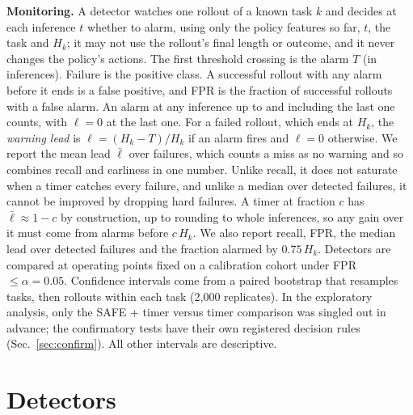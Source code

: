 \documentclass[10pt,a4paper,twocolumn]{article}
\begin{document}
\textbf{Monitoring.} A detector watches one rollout of a known task $k$ and decides at each
inference $t$ whether to alarm, using only the policy features so far, $t$, the task and
$H_k$; it may not use the rollout's final length or outcome, and it never changes the
policy's actions. The first threshold crossing is the alarm $T$ (in inferences). Failure is the positive class. A successful rollout with any alarm before it ends is a false
positive, and FPR is the fraction of successful rollouts with a false alarm. An alarm at any
inference up to and including the last one counts, with $\ell = 0$ at the last one. For a failed rollout, which ends at
$H_k$, the \emph{warning lead} is $\ell = (H_k - T)/H_k$ if an alarm fires and $\ell = 0$
otherwise.
We report the mean lead $\bar\ell$ over failures, which counts a miss as no warning and so
combines recall and earliness in one number. Unlike recall, it does not saturate when a
timer catches every failure, and unlike a median over detected failures, it cannot be
improved by dropping hard failures. A timer at fraction $c$ has $\bar\ell \approx 1 - c$ by construction, up to
rounding to whole inferences, so any gain over it must come from alarms before $c\,H_k$. We also report recall, FPR, the median lead
over detected failures and the fraction alarmed by $0.75\,H_k$.
Detectors are compared at operating points fixed on a calibration cohort under
FPR $\le \alpha = 0.05$. Confidence intervals come from a paired bootstrap that resamples
tasks, then rollouts within each task (2,000 replicates). In the exploratory analysis, only
the SAFE + timer versus timer comparison was singled out in advance; the confirmatory tests
have their own registered decision rules (Sec.~\ref{sec:confirm}). All other intervals are
descriptive.

\section{Detectors}
\end{document}
